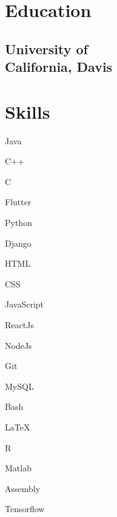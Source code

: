 \documentclass[]{deedy-resume-openfont}
\begin{document}
\begin{minipage}[t]{0.33\textwidth} 


\section{Education} 
\subsection*{University of\\ California, Davis\\}
\sectionsep


\section{Skills}
\begin{enumerate*}[label=\textbullet{}]
  \item Java
  \item C++
  \item C 
  \item Flutter 
  \item Python
  \item Django
  \item HTML 
  \item CSS 
  \item JavaScript
  \item ReactJs
  \item NodeJs
  \item Git 
  \item MySQL
  \item Bash 
  \item \LaTeX
  \item R 
  \item Matlab
  \item Assembly
  \item Tensorflow
\end{enumerate*}
\sectionsep


\end{minipage}
\end{document}

